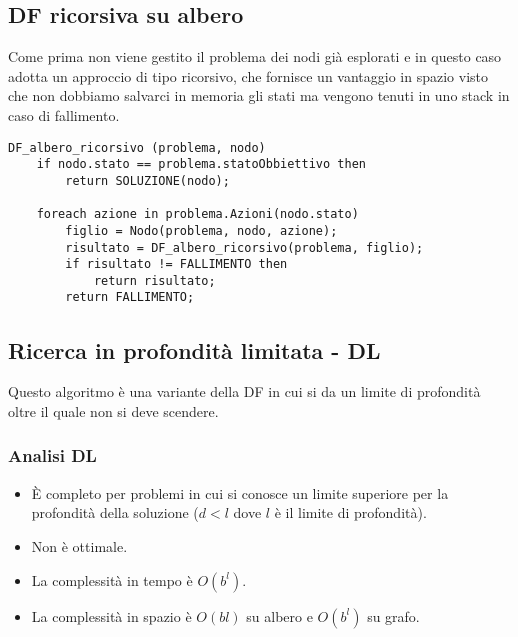 \subsection{DF ricorsiva su albero}
Come prima non viene gestito il problema dei nodi gi\`a esplorati e in questo caso adotta un
approccio di tipo ricorsivo, che fornisce un vantaggio in spazio visto che non dobbiamo
salvarci in memoria gli stati ma vengono tenuti in uno stack in caso di fallimento.
\begin{lstlisting}[style=pseudo-style]
DF_albero_ricorsivo (problema, nodo)
	if nodo.stato == problema.statoObbiettivo then
		return SOLUZIONE(nodo);

	foreach azione in problema.Azioni(nodo.stato)
		figlio = Nodo(problema, nodo, azione);
		risultato = DF_albero_ricorsivo(problema, figlio);
		if risultato != FALLIMENTO then
			return risultato;
		return FALLIMENTO;
\end{lstlisting}

\subsection{Ricerca in profondit\`a limitata - DL}
Questo algoritmo \`e una variante della DF in cui si da un limite di profondit\`a oltre
il quale non si deve scendere.

\subsubsection{Analisi DL}
\begin{itemize}
	\item \`E completo per problemi in cui si conosce un limite superiore per la profondit\`a
	      della soluzione ($d < l$ dove $l$ \`e il limite di profondit\`a).
	\item Non \`e ottimale.
	\item La complessit\`a in tempo \`e $O(b^l)$.
	\item La complessit\`a in spazio \`e $O(bl)$ su albero e $O(b^l)$ su grafo.
\end{itemize}

